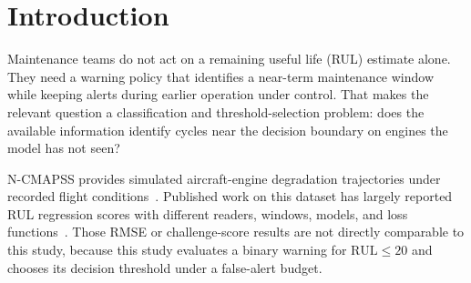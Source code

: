 \begin{abstract}
Run-to-failure engine data can make a maintenance warning look successful for
the wrong reason: elapsed cycle count is already informative about how close an
engine is to its recorded failure. This study tests whether measured telemetry
adds useful final-window warning information beyond elapsed cycle and current
operating conditions. We label a simulated turbofan engine cycle positive when
$\mathrm{RUL}\leq20$ and use 90 complete trajectories from the public,
$100\times$-downsampled tiny-N-CMAPSS training partition. The corrected input
definition uses the 14 measured physical channels documented by N-CMAPSS. It
excludes the auxiliary flight-class and health-state fields, unit ID, and RUL.

Five outer engine-held-out folds and four inner engine-grouped folds select a
threshold for a 5\% pre-window false-alert budget. The cycle-plus-operating
baseline recalls 55.4\% of final-window cycles. Adding the 14 measured channels
raises recall to 79.3\% at the matched alert budget. The paired engine-cluster
bootstrap estimates a 23.9-percentage-point recall gain, with a 95\% interval
from 18.3 to 29.6 percentage points.

The result shows that the measured telemetry in this simulator reduces missed
final-window cycles beyond a clock-and-operating-state baseline. It does not
set a service interval, validate a fielded aircraft system, or certify safety.
\end{abstract}

\section{Introduction}

Maintenance teams do not act on a remaining useful life (RUL) estimate alone.
They need a warning policy that identifies a near-term maintenance window while
keeping alerts during earlier operation under control. That makes the relevant
question a classification and threshold-selection problem: does the available
information identify cycles near the decision boundary on engines the model has
not seen?

N-CMAPSS provides simulated aircraft-engine degradation trajectories under
recorded flight conditions~\cite{ariaschao2021ncmapss}. Published work on this
dataset has largely reported RUL regression scores with different readers,
windows, models, and loss functions~\cite{ariaschao2022fusing,lovberg2021variable,solismartin2021stacked}.
Those RMSE or challenge-score results are not directly comparable to this
study, because this study evaluates a binary warning for $\mathrm{RUL}\leq20$
and chooses its decision threshold under a false-alert budget.

